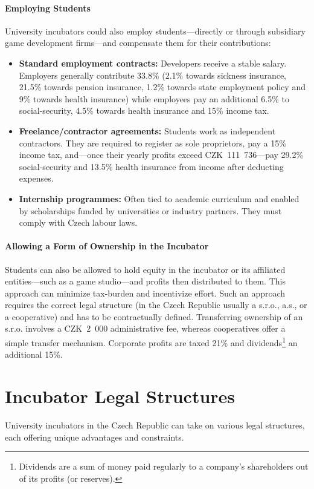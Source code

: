 \paragraph{Employing Students}
University incubators could also employ students—directly or through subsidiary game development firms—and compensate them for their contributions:
\begin{itemize}
    \item \textbf{Standard employment contracts:} Developers receive a stable salary. Employers generally contribute 33.8\% (2.1\% towards sickness insurance, 21.5\% towards pension insurance, 1.2\% towards state employment policy and 9\% towards health insurance) while employees pay an additional 6.5\% to social-security, 4.5\% towards health insurance and 15\% income tax.
    \item \textbf{Freelance/contractor agreements:} Students work as independent contractors. They are required to register as sole proprietors, pay a 15\% income tax, and—once their yearly profits exceed CZK~111~736—pay 29.2\% social-security and 13.5\% health insurance from income after deducting expenses.
    \item \textbf{Internship programmes:} Often tied to academic curriculum and enabled by scholarships funded by universities or industry partners. They must comply with Czech labour laws.
\end{itemize}

\paragraph{Allowing a Form of Ownership in the Incubator}
Students can also be allowed to hold equity in the incubator or its affiliated entities—such as a game studio—and profits then distributed to them. This approach can minimize tax-burden and incentivize effort. Such an approach requires the correct legal structure (in the Czech Republic usually a s.r.o., a.s., or a cooperative) and has to be contractually defined. Transferring ownership of an s.r.o. involves a CZK~2~000 administrative fee, whereas cooperatives offer a simple transfer mechanism. Corporate profits are taxed 21\% and dividends\footnote{Dividends are a sum of money paid regularly to a company’s shareholders out of its profits (or reserves).} an additional 15\%.

\section{Incubator Legal Structures}
University incubators in the Czech Republic can take on various legal structures, each offering unique advantages and constraints.

